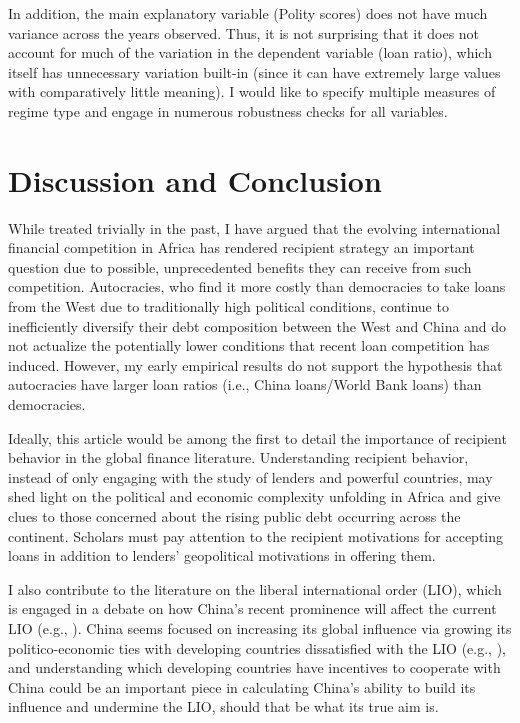 \documentclass[12pt]{article}
\begin{document}
In addition, the main explanatory variable (Polity scores) does not have much variance across the years observed. Thus, it is not surprising that it does not account for much of the variation in the dependent variable (loan ratio), which itself has unnecessary variation built-in (since it can have extremely large values with comparatively little meaning). I would like to specify multiple measures of regime type and engage in numerous robustness checks for all variables. 

\section*{Discussion and Conclusion}
While treated trivially in the past, I have argued that the evolving international financial competition in Africa has rendered recipient strategy an important question due to possible, unprecedented benefits they can receive from such competition. Autocracies, who find it more costly than democracies to take loans from the West due to traditionally high political conditions, continue to inefficiently diversify their debt composition between the West and China and do not actualize the potentially lower conditions that recent loan competition has induced. However, my early empirical results do not support the hypothesis that autocracies have larger loan ratios (i.e., China loans/World Bank loans) than democracies.
 
Ideally, this article would be among the first to detail the importance of recipient behavior in the global finance literature. Understanding recipient behavior, instead of only engaging with the study of lenders and powerful countries, may shed light on the political and economic complexity unfolding in Africa and give clues to those concerned about the rising public debt occurring across the continent. Scholars must pay attention to the recipient motivations for accepting loans in addition to lenders' geopolitical motivations in offering them. 

I also contribute to the literature on the liberal international order (LIO), which is engaged in a debate on how China's recent prominence will affect the current LIO (e.g., \cite{weiss2021a}). China seems focused on increasing its global influence via growing its politico-economic ties with developing countries dissatisfied with the LIO (e.g., \cite{broz2020}), and understanding which developing countries have incentives to cooperate with China could be an important piece in calculating China's ability to build its influence and undermine the LIO, should that be what its true aim is. \nocite{leppert2021} \nocite{curini2020}

\pagebreak
\printbibliography
\end{document}
